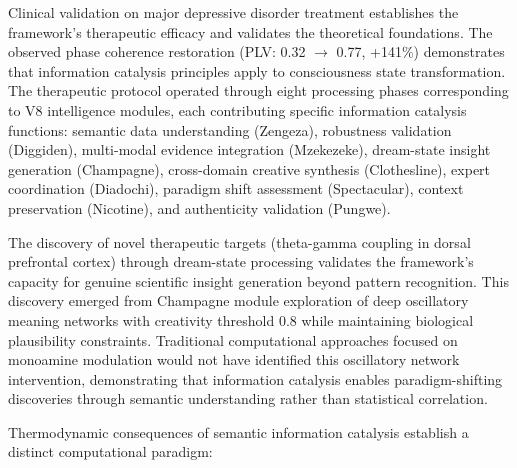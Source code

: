 \documentclass[12pt,a4paper]{article}
\theoremstyle{definition}
\theoremstyle{remark}
\begin{document}
Clinical validation on major depressive disorder treatment establishes the framework's therapeutic efficacy and validates the theoretical foundations. The observed phase coherence restoration (PLV: 0.32 \(\to\) 0.77, +141\%) demonstrates that information catalysis principles apply to consciousness state transformation. The therapeutic protocol operated through eight processing phases corresponding to V8 intelligence modules, each contributing specific information catalysis functions: semantic data understanding (Zengeza), robustness validation (Diggiden), multi-modal evidence integration (Mzekezeke), dream-state insight generation (Champagne), cross-domain creative synthesis (Clothesline), expert coordination (Diadochi), paradigm shift assessment (Spectacular), context preservation (Nicotine), and authenticity validation (Pungwe).

The discovery of novel therapeutic targets (theta-gamma coupling in dorsal prefrontal cortex) through dream-state processing validates the framework's capacity for genuine scientific insight generation beyond pattern recognition. This discovery emerged from Champagne module exploration of deep oscillatory meaning networks with creativity threshold 0.8 while maintaining biological plausibility constraints. Traditional computational approaches focused on monoamine modulation would not have identified this oscillatory network intervention, demonstrating that information catalysis enables paradigm-shifting discoveries through semantic understanding rather than statistical correlation.

Thermodynamic consequences of semantic information catalysis establish a distinct computational paradigm:
\end{document}
